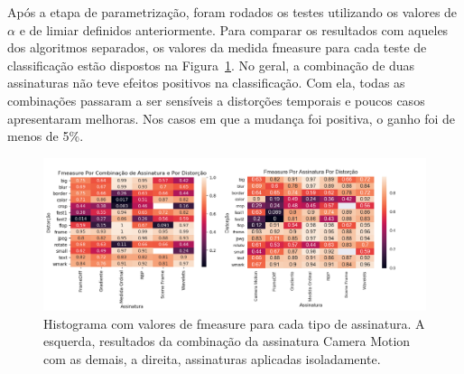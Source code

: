 Após a etapa de parametrização, foram rodados os testes utilizando os valores de $\alpha$ e de limiar definidos anteriormente. Para comparar os resultados com aqueles dos algoritmos separados, os valores da medida fmeasure para cada teste de classificação estão dispostos na Figura~\ref{fig:compacao-metodos}. No geral, a combinação de duas assinaturas não teve efeitos positivos na classificação. Com ela, todas as combinações passaram a ser sensíveis a distorções temporais e poucos casos apresentaram melhoras. Nos casos em que a mudança foi positiva, o ganho foi de menos de 5\%. 

\begin{figure}
	\caption{Histograma com valores de fmeasure para cada tipo de assinatura. A esquerda, resultados da combinação da assinatura Camera Motion com as demais, a direita, assinaturas aplicadas isoladamente.}
	\label{fig:compacao-metodos}
	\includegraphics[width=\textwidth]{dados/figuras/experimentos/heatmap_final_comparacao.png}
\end{figure}






